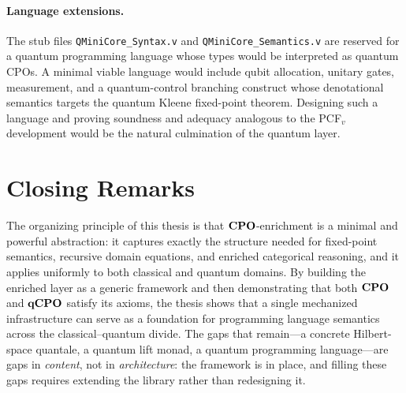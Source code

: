 \paragraph{Language extensions.}
The stub files \texttt{QMiniCore\_Syntax.v} and
\texttt{QMiniCore\_Semantics.v} are reserved for a quantum
programming language whose types would be interpreted as quantum
CPOs.
A minimal viable language would include qubit allocation, unitary
gates, measurement, and a quantum-control branching construct
whose denotational semantics targets the quantum Kleene fixed-point
theorem.
Designing such a language and proving soundness and adequacy
analogous to the PCF$_v$ development would be the natural
culmination of the quantum layer.

\section{Closing Remarks}
\label{sec:conc-closing}

The organizing principle of this thesis is that $\mathbf{CPO}$-enrichment is
a minimal and powerful abstraction: it captures exactly the structure
needed for fixed-point semantics, recursive domain equations, and
enriched categorical reasoning, and it applies uniformly to both
classical and quantum domains.
By building the enriched layer as a generic framework and then
demonstrating that both $\mathbf{CPO}$ and $\mathbf{qCPO}$ satisfy its axioms, the
thesis shows that a single mechanized infrastructure can serve as a
foundation for programming language semantics across the
classical--quantum divide.
The gaps that remain---a concrete Hilbert-space quantale, a quantum
lift monad, a quantum programming language---are gaps in
\emph{content}, not in \emph{architecture}: the framework is in
place, and filling these gaps requires extending the library rather
than redesigning it.
